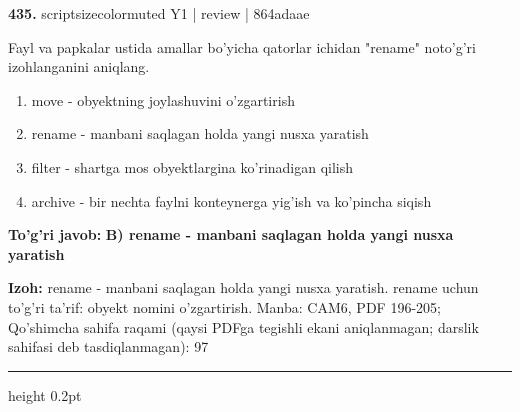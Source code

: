 \documentclass[10pt,a4paper]{article}
\begin{document}
{\bfseries\sffamily\color{ink} 435.} {scriptsizecolor{muted} Y1 | review | 864adaae}
\par
Fayl va papkalar ustida amallar bo'yicha qatorlar ichidan "rename" noto'g'ri izohlanganini aniqlang.
\begin{enumerate}[label=\Alph*),leftmargin=9mm]
\item move - obyektning joylashuvini o'zgartirish
\item rename - manbani saqlagan holda yangi nusxa yaratish
\item filter - shartga mos obyektlargina ko'rinadigan qilish
\item archive - bir nechta faylni konteynerga yig'ish va ko'pincha siqish
\end{enumerate}
\begin{tcolorbox}[enhanced,breakable,colback=teal!4,colframe=teal!60!black,boxrule=0.45pt,arc=1.2mm,left=2.7mm,right=2.7mm,top=1.8mm,bottom=1.8mm,before skip=2mm,after skip=2mm]
{\bfseries\sffamily\color{teal}To'g'ri javob:} \textbf{B) rename - manbani saqlagan holda yangi nusxa yaratish}
\par\smallskip
{\bfseries Izoh:} rename - manbani saqlagan holda yangi nusxa yaratish. rename uchun to'g'ri ta'rif: obyekt nomini o'zgartirish. Manba: CAM6, PDF 196-205; Qo'shimcha sahifa raqami (qaysi PDFga tegishli ekani aniqlanmagan; darslik sahifasi deb tasdiqlanmagan): 97
\end{tcolorbox}
\vspace{2mm}\hrule height 0.2pt\vspace{3mm}
\end{document}
